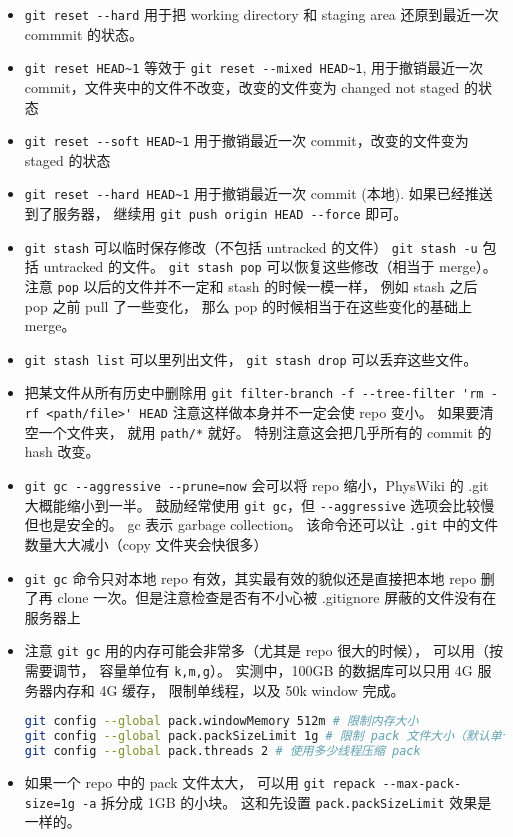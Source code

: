 \begin{itemize}
\item \verb`git reset --hard` 用于把 working directory 和 staging area 还原到最近一次 commmit 的状态。
\item \verb`git reset HEAD~1` 等效于 \verb`git reset --mixed HEAD~1`, 用于撤销最近一次 commit，文件夹中的文件不改变，改变的文件变为 changed not staged 的状态
\item \verb`git reset --soft HEAD~1` 用于撤销最近一次 commit，改变的文件变为 staged 的状态
\item \verb`git reset --hard HEAD~1` 用于撤销最近一次 commit (本地). 如果已经推送到了服务器， 继续用 \verb`git push origin HEAD --force` 即可。
\item \verb`git stash` 可以临时保存修改（不包括 untracked 的文件） \verb`git stash -u` 包括 untracked 的文件。 \verb`git stash pop` 可以恢复这些修改（相当于 merge）。 注意 \verb`pop` 以后的文件并不一定和 stash 的时候一模一样， 例如 stash 之后 pop 之前 pull 了一些变化， 那么 pop 的时候相当于在这些变化的基础上 merge。
\item \verb`git stash list` 可以里列出文件， \verb`git stash drop` 可以丢弃这些文件。
\item 把某文件从所有历史中删除用 \verb`git filter-branch -f --tree-filter 'rm -rf <path/file>' HEAD` 注意这样做本身并不一定会使 repo 变小。 如果要清空一个文件夹， 就用 \verb`path/*` 就好。 特别注意这会把几乎所有的 commit 的 hash 改变。
\item \verb`git gc --aggressive --prune=now` 会可以将 repo 缩小，PhysWiki 的 .git 大概能缩小到一半。 鼓励经常使用 \verb`git gc`，但 \verb`--aggressive` 选项会比较慢但也是安全的。 gc 表示 garbage collection。 该命令还可以让 \verb`.git` 中的文件数量大大减小（copy 文件夹会快很多）
\item \verb`git gc` 命令只对本地 repo 有效，其实最有效的貌似还是直接把本地 repo 删了再 clone 一次。但是注意检查是否有不小心被 .gitignore 屏蔽的文件没有在服务器上
\item 注意 \verb`git gc` 用的内存可能会非常多（尤其是 repo 很大的时候）， 可以用（按需要调节， 容量单位有 \verb`k,m,g`）。 实测中，100GB 的数据库可以只用 4G 服务器内存和 4G 缓存， 限制单线程，以及 50k window 完成。
\begin{lstlisting}[language=bash]
git config --global pack.windowMemory 512m # 限制内存大小
git config --global pack.packSizeLimit 1g # 限制 pack 文件大小（默认单个文件）
git config --global pack.threads 2 # 使用多少线程压缩 pack
\end{lstlisting}
\item 如果一个 repo 中的 pack 文件太大， 可以用 \verb`git repack --max-pack-size=1g -a` 拆分成 1GB 的小块。 这和先设置 \verb`pack.packSizeLimit` 效果是一样的。

\end{itemize}
